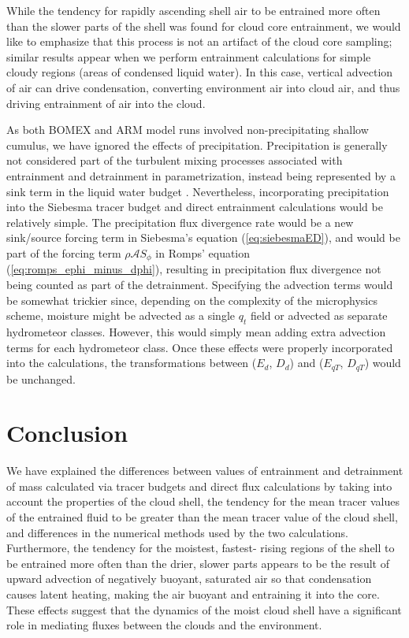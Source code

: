 \documentclass[12pt]{article}
\begin{document}
While the tendency for rapidly ascending shell air to be entrained more often 
than the slower parts of the shell was found for cloud core entrainment, we 
would like to emphasize that this process is not an artifact of the cloud core 
sampling; similar results appear when we perform entrainment calculations for 
simple cloudy regions (areas of condensed liquid water).  In this case,
vertical advection of air can drive condensation, converting environment air 
into cloud air, and thus driving entrainment of air into the cloud.

As both BOMEX and ARM model runs involved non-precipitating shallow cumulus, 
we have ignored the effects of precipitation.  Precipitation is generally not
considered part of the turbulent mixing processes associated with entrainment 
and detrainment in parametrization, instead being represented by a sink 
term in the liquid water budget \citep{Tiedtke1989, Kain1990}.  
Nevertheless, incorporating precipitation into the Siebesma tracer budget 
and direct entrainment calculations would be relatively simple.  The
precipitation flux divergence rate would be a new sink/source forcing term in 
Siebesma's equation (\ref{eq:siebesmaED}),
and would be part of the forcing term $\rho \mathcal{A}S_\phi$ in Romps'
 equation (\ref{eq:romps_ephi_minus_dphi}), resulting in precipitation flux 
divergence not being counted as part of the detrainment.  Specifying the 
advection terms would be somewhat trickier since, depending on the complexity 
of the microphysics scheme, moisture might be advected as a single $q_t$ field 
or advected as separate hydrometeor classes.  However, this would simply mean 
adding extra advection terms for each hydrometeor class.  Once these effects 
were properly incorporated into the calculations, the transformations between 
($E_d$, $D_d$) and ($E_{qT}$, $D_{qT}$) would be unchanged.


\section{Conclusion}

We have explained the differences between values of entrainment and detrainment 
of mass calculated via tracer budgets and direct flux calculations by 
taking into account the properties of the cloud shell, the tendency for
the mean tracer values of the entrained fluid to be greater than the mean 
tracer value of the cloud shell, and differences in the numerical methods used 
by the two calculations.  Furthermore, the tendency for the moistest, fastest-
rising regions of the shell to be entrained more often than the drier, slower
parts appears to be the result of upward advection of negatively buoyant, 
saturated air so that condensation causes latent heating, making the air 
buoyant and entraining it into the core.  These effects suggest that the 
dynamics of the moist cloud shell have a significant role in mediating fluxes 
between the clouds and the environment. 
\end{document}
